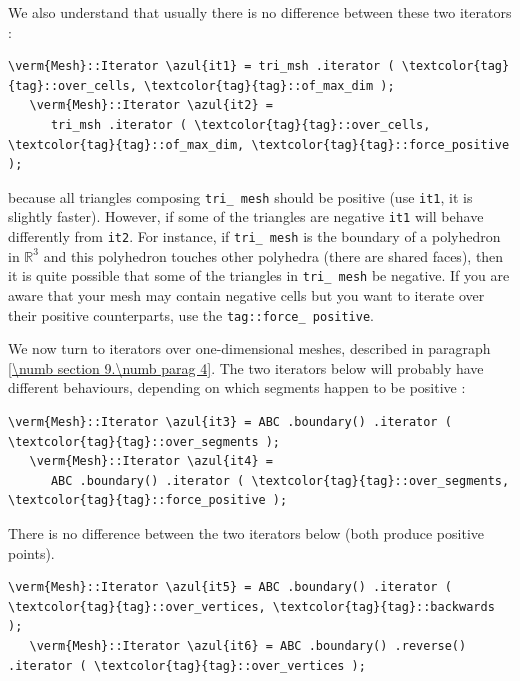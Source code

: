 We also understand that usually there is no difference between these two iterators :

\begin{Verbatim}[commandchars=\\\{\},formatcom=\small\tt,
   baselinestretch=0.94,framesep=2mm                      ]
   \verm{Mesh}::Iterator \azul{it1} = tri_msh .iterator ( \textcolor{tag}{tag}::over_cells, \textcolor{tag}{tag}::of_max_dim );
   \verm{Mesh}::Iterator \azul{it2} =
      tri_msh .iterator ( \textcolor{tag}{tag}::over_cells, \textcolor{tag}{tag}::of_max_dim, \textcolor{tag}{tag}::force_positive );
\end{Verbatim}

\noindent because all triangles composing {\small\tt tri\_\,mesh} should be positive
(use {\small\tt it1}, it is slightly faster).
However, if some of the triangles are negative {\small\tt it1} will behave differently from
{\small\tt it2}.
For instance, if {\small\tt tri\_\,mesh} is the boundary of a polyhedron in $ \mathbb{R}^3 $
and this polyhedron touches other polyhedra (there are shared faces), then it is
quite possible that some of the triangles in {\small\tt tri\_\,mesh} be negative.
If you are aware that your mesh may contain negative cells but
you want to iterate over their positive counterparts, use the {\small\tt \textcolor{tag}{tag}::force\_\,positive}.

We now turn to iterators over one-dimensional meshes, described in paragraph
\ref{\numb section 9.\numb parag 4}.
The two iterators below will probably have different behaviours,
depending on which segments happen to be positive :

\begin{Verbatim}[commandchars=\\\{\},formatcom=\small\tt,
   baselinestretch=0.94,framesep=2mm                      ]
   \verm{Mesh}::Iterator \azul{it3} = ABC .boundary() .iterator ( \textcolor{tag}{tag}::over_segments );
   \verm{Mesh}::Iterator \azul{it4} =
      ABC .boundary() .iterator ( \textcolor{tag}{tag}::over_segments, \textcolor{tag}{tag}::force_positive );
\end{Verbatim}

There is no difference between the two iterators below (both produce positive
points).

\begin{Verbatim}[commandchars=\\\{\},formatcom=\small\tt,
   baselinestretch=0.94,framesep=2mm                      ]
   \verm{Mesh}::Iterator \azul{it5} = ABC .boundary() .iterator ( \textcolor{tag}{tag}::over_vertices, \textcolor{tag}{tag}::backwards );
   \verm{Mesh}::Iterator \azul{it6} = ABC .boundary() .reverse() .iterator ( \textcolor{tag}{tag}::over_vertices );
\end{Verbatim}

